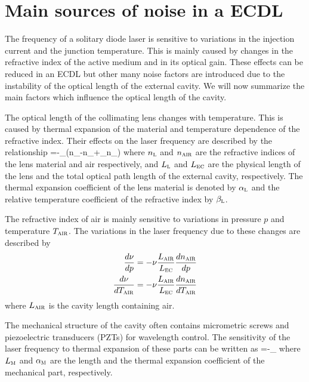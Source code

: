 	\section{Main sources of noise in a ECDL}
The frequency of a solitary diode laser is sensitive to variations in the injection current and the junction temperature. This is mainly caused by changes in the refractive index of the active medium and in its optical gain. 
These effects can be reduced in an ECDL but other many noise factors are introduced due to the instability of the optical length of the external cavity.
We will now summarize the main factors which influence the optical length of the cavity.

The optical length of the collimating lens changes with temperature. This is caused by thermal expansion of the material and temperature dependence of the refractive index. Their effects on the laser frequency are described by the relationship 
\mate
{}=-\nu{}\alpha_{}\left(n_{}-n_{}+\beta_{}n_{}\right)
\label{effect1}
\atem
where $n_{\mbox{\footnotesize{\scshape{l}}}}$ and $n_{\mbox{\footnotesize{\scshape{air}}}}$ are the refractive indices of the lens material and air respectively, and $L_{\mbox{\footnotesize{\scshape{l}}}}$ and $L_{\mbox{\footnotesize{\scshape{ec}}}}$ are the physical length of the lens and the total optical path length of the external cavity, respectively. The thermal expansion coefficient of the lens material is denoted by $\alpha_{\mbox{\footnotesize{\scshape{l}}}}$ and the relative temperature coefficient of the refractive index by $\beta_{\mbox{\footnotesize{\scshape{l}}}}$. 

The refractive index of air is mainly sensitive to variations in pressure $p$ and temperature $T_{\mbox{\footnotesize{\scshape{air}}}}$. The variations in the laser frequency due to these changes are described by
\begin{align}
\frac{d\nu}{dp}=-\nu\frac{L_{\mbox{\footnotesize{\scshape{air}}}}}{L_{\mbox{\footnotesize{\scshape{ec}}}}}\frac{dn_{\mbox{\footnotesize{\scshape{air}}}}}{dp}\label{effect2}\\
\frac{d\nu}{dT_{\mbox{\footnotesize{\scshape{air}}}}}=-\nu\frac{L_{\mbox{\footnotesize{\scshape{air}}}}}{L_{\mbox{\footnotesize{\scshape{ec}}}}}\frac{dn_{\mbox{\footnotesize{\scshape{air}}}}}{dT_{\mbox{\footnotesize{\scshape{air}}}}}
\label{effect3}
\end{align}
where $L_{\mbox{\footnotesize{\scshape{air}}}}$ is the cavity length containing air.	

The mechanical structure of the cavity often contains micrometric screws and piezoelectric transducers (PZTs) for wavelength control. The sensitivity of the laser frequency to thermal expansion of these parts can be written as
\mate
{}=-\nu{}\alpha_{}
\label{effect4}
\atem
where $L_{\mbox{\footnotesize{\scshape{m}}}}$ and $\alpha_{\mbox{\footnotesize{\scshape{m}}}}$ are the length and the thermal expansion coefficient of the mechanical part, respectively.


